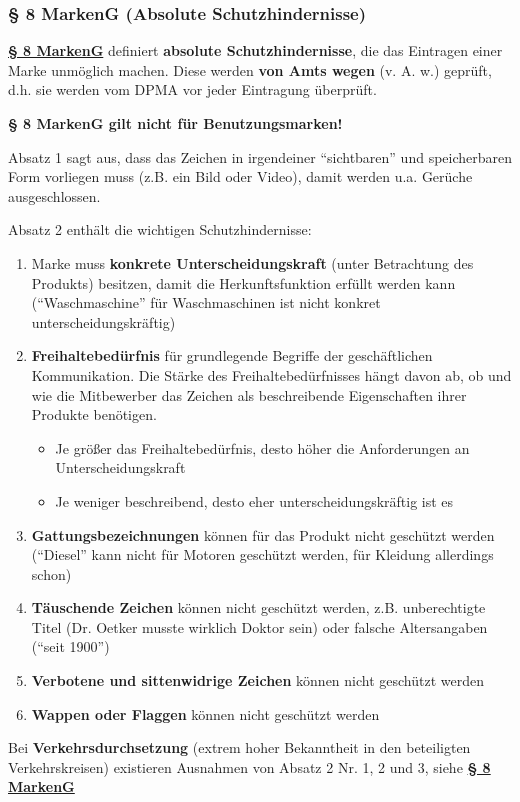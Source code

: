 \documentclass[12pt,A4]{extarticle}
\newcommand{\highlight}[1]{\textcolor{highlightColor}{\textbf{#1}}}
\newcommand{\markenG}[2][]{\textbf{\textcolor{markenGesetzLink}{\href{https://www.gesetze-im-internet.de/markeng/__#2.html}{§ #2 \ifthenelse{\equal{#1}{}}{}{#1 }MarkenG}}}}
\begin{document}
\subsubsection{§ 8 MarkenG (Absolute Schutzhindernisse)}
\markenG{8} definiert \highlight{absolute Schutzhindernisse}, die das Eintragen einer Marke unmöglich machen.
Diese werden \textbf{von Amts wegen} (v. A. w.) geprüft, d.h. sie werden vom DPMA vor jeder Eintragung überprüft.\par
\textbf{§ 8 MarkenG gilt nicht für Benutzungsmarken!}\par
Absatz 1 sagt aus, dass das Zeichen in irgendeiner ``sichtbaren'' und speicherbaren Form vorliegen muss (z.B. ein Bild oder Video), damit werden u.a. Gerüche ausgeschlossen.\par
Absatz 2 enthält die wichtigen Schutzhindernisse:
\begin{enumerate}
  \item{Marke muss \highlight{konkrete Unterscheidungskraft} (unter Betrachtung des Produkts) besitzen, damit die Herkunftsfunktion erfüllt werden kann (``Waschmaschine'' für Waschmaschinen ist nicht konkret unterscheidungskräftig)}
  \item{\textbf{Freihaltebedürfnis} für grundlegende Begriffe der geschäftlichen Kommunikation. Die Stärke des Freihaltebedürfnisses hängt davon ab, ob und wie die Mitbewerber das Zeichen als beschreibende Eigenschaften ihrer Produkte benötigen.
              \begin{itemize}
                \item{Je größer das Freihaltebedürfnis, desto höher die Anforderungen an Unterscheidungskraft}
                \item{Je weniger beschreibend, desto eher unterscheidungskräftig ist es}
              \end{itemize}
        }
  \item{\textbf{Gattungsbezeichnungen} können für das Produkt nicht geschützt werden (``Diesel'' kann nicht für Motoren geschützt werden, für Kleidung allerdings schon)}
  \item{\textbf{Täuschende Zeichen} können nicht geschützt werden, z.B. unberechtigte Titel (Dr. Oetker musste wirklich Doktor sein) oder falsche Altersangaben (``seit 1900'')}
  \item{\textbf{Verbotene und sittenwidrige Zeichen} können nicht geschützt werden}
  \item{\textbf{Wappen oder Flaggen} können nicht geschützt werden}
\end{enumerate}
Bei \highlight{Verkehrsdurchsetzung} (extrem hoher Bekanntheit in den beteiligten Verkehrskreisen) existieren Ausnahmen von Absatz 2 Nr. 1, 2 und 3, siehe \markenG[Abs. 3]{8}
\end{document}
